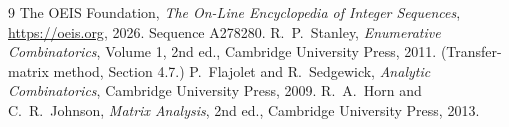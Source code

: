 \documentclass[11pt,a4paper]{article}
\theoremstyle{plain}
\theoremstyle{definition}
\begin{document}
\begin{thebibliography}{9}
 The OEIS Foundation, \emph{The On-Line Encyclopedia of Integer
Sequences}, \url{https://oeis.org}, 2026. Sequence A278280.
 R.~P.~Stanley, \emph{Enumerative Combinatorics}, Volume 1, 2nd ed.,
Cambridge University Press, 2011. (Transfer-matrix method, Section 4.7.)
 P.~Flajolet and R.~Sedgewick, \emph{Analytic Combinatorics}, Cambridge
University Press, 2009.
 R.~A.~Horn and C.~R.~Johnson, \emph{Matrix Analysis}, 2nd ed., Cambridge
University Press, 2013.
\end{thebibliography}
\end{document}
